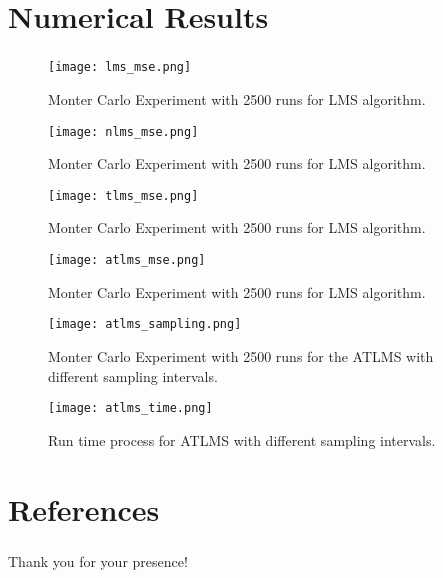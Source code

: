 \documentclass[10pt]{beamer}
\begin{document}
\section{Numerical Results}
\begin{frame}[allowframebreaks]
    \frametitle{\insertsection}
    \begin{figure}
        \centering
        \texttt{[image: lms\_mse.png]}
        \caption{Monter Carlo Experiment with 2500 runs for LMS algorithm.}
        \label{fig:lms} 
    \end{figure}
    \begin{figure}
        \centering
        \texttt{[image: nlms\_mse.png]}
        \caption{Monter Carlo Experiment with 2500 runs for LMS algorithm.}
        \label{fig:nlms} 
    \end{figure}
    \begin{figure}
        \centering
        \texttt{[image: tlms\_mse.png]}
        \caption{Monter Carlo Experiment with 2500 runs for LMS algorithm.}
        \label{fig:tlms} 
    \end{figure}
    \begin{figure}
        \centering
        \texttt{[image: atlms\_mse.png]}
        \caption{Monter Carlo Experiment with 2500 runs for LMS algorithm.}
        \label{fig:atlms} 
    \end{figure}
    \begin{figure}
        \centering
        \texttt{[image: atlms\_sampling.png]}
        \caption{Monter Carlo Experiment with 2500 runs for the ATLMS with different sampling intervals.}
        \label{fig:atlms_sampling} 
    \end{figure}
    \begin{figure}
        \centering
        \texttt{[image: atlms\_time.png]}
        \caption{Run time process for ATLMS with different sampling intervals.}
        \label{fig:atlms_time} 
    \end{figure}
\end{frame}

\section{References}
\begin{frame} 
    \frametitle{\insertsection}
    
    
\end{frame}

\begin{frame}
    \begin{center}
        \Huge Thank you for your presence!
    \end{center}
\end{frame}
\end{document}

